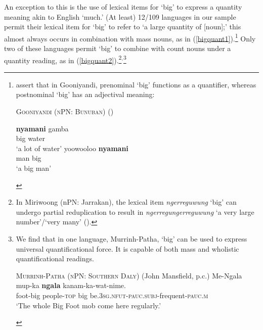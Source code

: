\documentclass[12pt,egregdoesnotlikesansseriftitles]{scrartcl}
\begin{document}
An exception to this is the use of lexical items for `big' to express a quantity meaning akin to English `much.' (At least) 12/109 languages in our sample permit their lexical item for `big' to refer to `a large quantity of [noun];' this almost always occurs in combination with mass nouns, as in (\ref{bigquant1}).\footnote{\citet[37]{louagieverstraete16} assert that in Gooniyandi, prenominal `big' functions as a quantifier, whereas postnominal `big' has an adjectival meaning:
    \vspace{-2mm}
    \begin{exe}
      \ex  \textsc{Gooniyandi (nPN: Bunuban)} (\citealt{mcgregor90})
      \begin{xlist}
      \begin{multicols}{2}
        \ex \gll \textbf{nyamani} gamba\\
        big water \\
        \glt `a lot of water'%
        \ex \gll yoowooloo \textbf{nyamani} \\
        man big \\
        \glt `a big man' %
    \end{multicols}
      \end{xlist}
    \end{exe}
  } Only two of these languages permit `big' to combine with count nouns under a quantity reading, as in (\ref{bigquant2}).\footnote{
  In Miriwoong (nPN: Jarrakan), the lexical item \textit{ngerreguwung} `big' can undergo partial reduplication to result in \textit{ngerregungerreguwung} `a very large number'/`very many' (\citealt[43]{kofod78}).
  }$^{,}$\footnote{We find that in one language, Murrinh-Patha, `big' can be used to express universal quantificational force. It is capable of both mass and wholistic quantificational readings.
  
\begin{exe}
\ex  \textsc{Murrinh-Patha (nPN: Southern Daly)} (John Mansfield, p.c.)
\gll Me-Ngala mup-ka \textbf{ngala} kanam-ka-wat-nime.\\
foot-big people-\textsc{top} big be.3\textsc{sg.nfut-pauc.subj}-frequent-\textsc{pauc.m}\\
`The whole Big Foot mob come here regularly.'
\end{exe}
}
\end{document}
